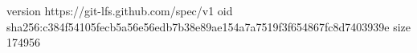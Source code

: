 version https://git-lfs.github.com/spec/v1
oid sha256:c384f54105fecb5a56e56edb7b38e89ae154a7a7519f3f654867fc8d7403939e
size 174956

